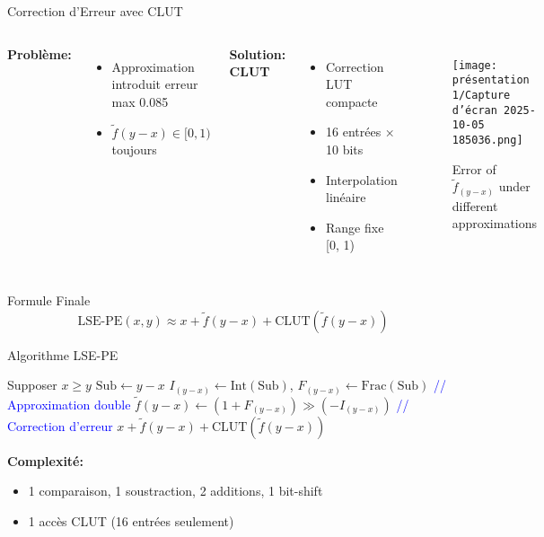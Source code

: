 \documentclass[aspectratio=169]{beamer}
\begin{document}
\begin{frame}{Correction d'Erreur avec CLUT}
\begin{columns}
\textbf{Problème:}
\begin{itemize}
\item Approximation introduit erreur max 0.085
\item $\tilde{f}(y-x) \in [0, 1)$ toujours
\end{itemize}

\vspace{0.3cm}
\textbf{Solution: CLUT}
\begin{itemize}
\item Correction LUT compacte
\item 16 entrées × 10 bits
\item Interpolation linéaire
\item Range fixe [0, 1)
\end{itemize}

\begin{figure}
    \centering
    \texttt{[image: présentation 1/Capture d’écran 2025-10-05 185036.png]}
    \caption{Error of $\tilde{f}_{(y−x)}$ under different approximations}
    \label{fig:enter-label}
\end{figure}
\end{columns}

\begin{block}{Formule Finale}
\[
\text{LSE-PE}(x, y) \approx x + \tilde{f}(y-x) + \text{CLUT}(\tilde{f}(y-x))
\]
\end{block}
\end{frame}

\begin{frame}[fragile]{Algorithme LSE-PE}
\begin{algorithmic}[1]
\State Supposer $x \geq y$
\State $\text{Sub} \gets y - x$
\State $I_{(y-x)} \gets \text{Int}(\text{Sub})$, $F_{(y-x)} \gets \text{Frac}(\text{Sub})$
\State
\State \textcolor{blue}{// Approximation double}
\State $\tilde{f}(y-x) \gets (1 + F_{(y-x)}) \gg (-I_{(y-x)})$
\State
\State \textcolor{blue}{// Correction d'erreur}
\State \Return $x + \tilde{f}(y-x) + \text{CLUT}(\tilde{f}(y-x))$
\EndFunction
\end{algorithmic}

\vspace{0.5cm}
\textbf{Complexité:} 
\begin{itemize}
\item 1 comparaison, 1 soustraction, 2 additions, 1 bit-shift
\item 1 accès CLUT (16 entrées seulement)
\end{itemize}
\end{frame}
\end{document}
